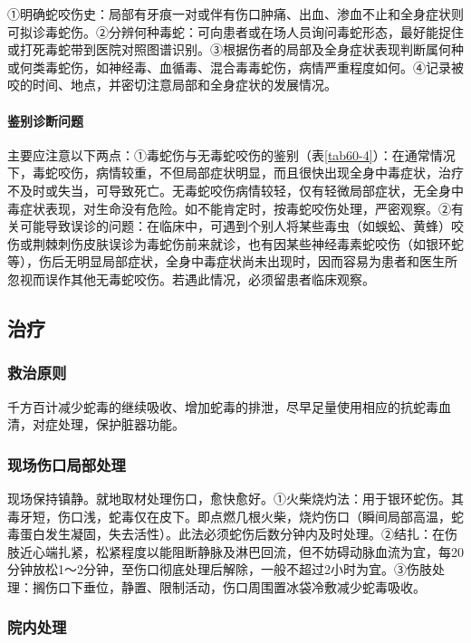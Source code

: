 ①明确蛇咬伤史：局部有牙痕一对或伴有伤口肿痛、出血、渗血不止和全身症状则可拟诊毒蛇伤。②分辨何种毒蛇：可向患者或在场人员询问毒蛇形态，最好能捉住或打死毒蛇带到医院对照图谱识别。③根据伤者的局部及全身症状表现判断属何种或何类毒蛇伤，如神经毒、血循毒、混合毒毒蛇伤，病情严重程度如何。④记录被咬的时间、地点，并密切注意局部和全身症状的发展情况。

\paragraph{鉴别诊断问题}

主要应注意以下两点：①毒蛇伤与无毒蛇咬伤的鉴别（表\ref{tab60-4}）：在通常情况下，毒蛇咬伤，病情较重，不但局部症状明显，而且很快出现全身中毒症状，治疗不及时或失当，可导致死亡。无毒蛇咬伤病情较轻，仅有轻微局部症状，无全身中毒症状表现，对生命没有危险。如不能肯定时，按毒蛇咬伤处理，严密观察。②有关可能导致误诊的问题：在临床中，可遇到个别人将某些毒虫（如蜈蚣、黄蜂）咬伤或荆棘刺伤皮肤误诊为毒蛇伤前来就诊，也有因某些神经毒素蛇咬伤（如银环蛇等），伤后无明显局部症状，全身中毒症状尚未出现时，因而容易为患者和医生所忽视而误作其他无毒蛇咬伤。若遇此情况，必须留患者临床观察。

\subsection{治疗}

\subsubsection{救治原则}

千方百计减少蛇毒的继续吸收、增加蛇毒的排泄，尽早足量使用相应的抗蛇毒血清，对症处理，保护脏器功能。

\subsubsection{现场伤口局部处理}

现场保持镇静。就地取材处理伤口，愈快愈好。①火柴烧灼法：用于银环蛇伤。其毒牙短，伤口浅，蛇毒仅在皮下。即点燃几根火柴，烧灼伤口（瞬间局部高温，蛇毒蛋白发生凝固，失去活性）。此法必须蛇伤后数分钟内及时处理。②结扎：在伤肢近心端扎紧，松紧程度以能阻断静脉及淋巴回流，但不妨碍动脉血流为宜，每20分钟放松1～2分钟，至伤口彻底处理后解除，一般不超过2小时为宜。③伤肢处理：搁伤口下垂位，静置、限制活动，伤口周围置冰袋冷敷减少蛇毒吸收。

\subsubsection{院内处理}

